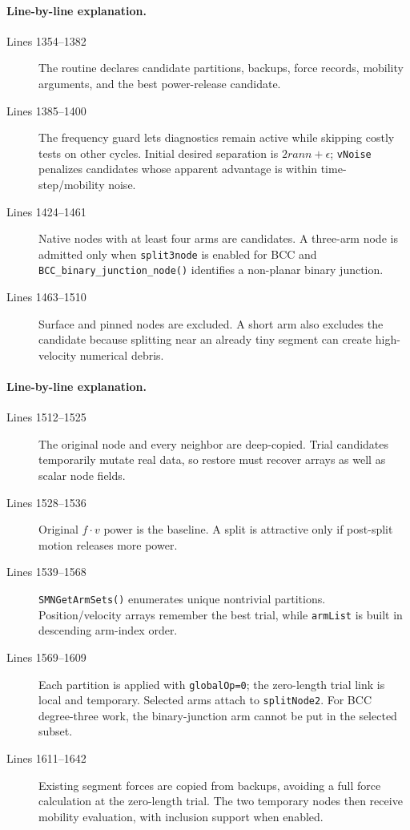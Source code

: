 \documentclass[11pt]{article}
\newcommand{\code}[1]{\texorpdfstring{\nolinkurl{#1}}{#1}}
\begin{document}
\paragraph{Line-by-line explanation.}
\begin{description}
\item[Lines 1354--1382] The routine declares candidate partitions, backups,
force records, mobility arguments, and the best power-release candidate.
\item[Lines 1385--1400] The frequency guard lets diagnostics remain active
while skipping costly tests on other cycles. Initial desired separation is
\(2rann+\epsilon\); \code{vNoise} penalizes candidates whose apparent
advantage is within time-step/mobility noise.
\item[Lines 1424--1461] Native nodes with at least four arms are candidates.
A three-arm node is admitted only when \code{split3node} is enabled for BCC
and \code{BCC_binary_junction_node()} identifies a non-planar binary junction.
\item[Lines 1463--1510] Surface and pinned nodes are excluded. A short arm
also excludes the candidate because splitting near an already tiny segment can
create high-velocity numerical debris.
\end{description}



\paragraph{Line-by-line explanation.}
\begin{description}
\item[Lines 1512--1525] The original node and every neighbor are deep-copied.
Trial candidates temporarily mutate real data, so restore must recover arrays
as well as scalar node fields.
\item[Lines 1528--1536] Original \(f\mathbin{\cdot}v\) power is the baseline.
A split is attractive only if post-split motion releases more power.
\item[Lines 1539--1568] \code{SMNGetArmSets()} enumerates unique nontrivial
partitions. Position/velocity arrays remember the best trial, while
\code{armList} is built in descending arm-index order.
\item[Lines 1569--1609] Each partition is applied with \code{globalOp=0};
the zero-length trial link is local and temporary. Selected arms attach to
\code{splitNode2}. For BCC degree-three work, the binary-junction arm cannot
be put in the selected subset.
\item[Lines 1611--1642] Existing segment forces are copied from backups,
avoiding a full force calculation at the zero-length trial. The two temporary
nodes then receive mobility evaluation, with inclusion support when enabled.
\end{description}
\end{document}
